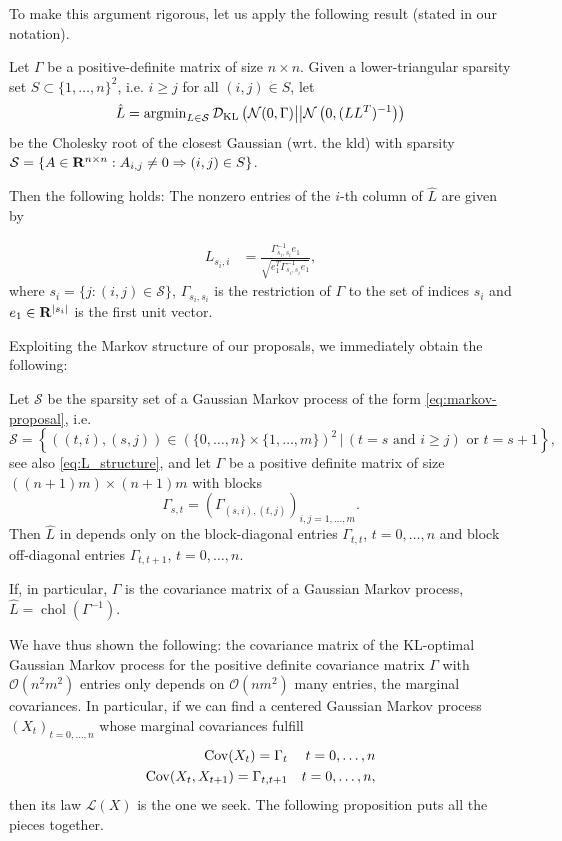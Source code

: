 To make this argument rigorous, let us apply the following result (stated in our notation).
\begin{theorem}
    \label{thm:schafer_cholesky_analytical}
    Let $\Gamma$ be a positive-definite matrix of size $n\times n$. Given a lower-triangular sparsity set $S \subset \{1, \dots, n\}^{2}$, i.e. $i \geq j$ for all $(i,j) \in S$, let 
    $$
    \hat L = \operatorname{argmin}_{L \in \mathcal S} \mathcal D_{\text{KL}} \left(\mathcal N (0, \Gamma) \middle|\middle| \mathcal N \left( 0, (LL^{T})^{-1} \right)\right)
    $$
    be the Cholesky root of the closest Gaussian (wrt. the \gls{kld}) with sparsity $\mathcal S = \{A \in \mathbf R^{n \times n}: A_{i,j} \neq 0 \Rightarrow (i,j) \in S\}$. 

    Then the following holds:
    The nonzero entries of the $i$-th column of $\hat L$ are given by 
    
    \begin{align}
    \label{eq:schafer_gamma}
        L_{s_{i}, i} &= \frac{\Gamma_{s_{i}, s_{i}}^{-1} e_{1}}{\sqrt{e_{1}^{T}\Gamma_{s_{i}, s_{i}}^{-1} e_{1}}},
    \end{align}
    where $s_{i} = \{j : (i,j) \in \mathcal S\}$, $\Gamma_{s_{i}, s_{i}}$ is the restriction of $\Gamma$ to the set of indices $s_{i}$ and $e_{1} \in\mathbf R^{\lvert s_{i}\rvert}$ is the first unit vector.
\end{theorem}
Exploiting the Markov structure of our proposals, we immediately obtain the following:
\begin{corollary}
    \label{cor:markov_sparsity}
    Let $\mathcal S$ be the sparsity set of a Gaussian Markov process of the form \eqref{eq:markov-proposal}, i.e. 
    $$
        \mathcal S = \left\{ ((t,i),(s,j)) \in \left(\{0,\dots, n\}\times \{1,\dots, m\}\right)^{2} \,|\, (t = s \text{ and } i \geq  j) \text{ or } t = s + 1 \right\},
    $$
    see also \eqref{eq:L_structure},
    and let $\Gamma$ be a positive definite matrix of size $((n+1)m)\times(n + 1)m$ with blocks
    $$
        \Gamma_{s,t} = (\Gamma_{(s,i),(t,j)})_{i,j =1,\dots,m}.
    $$
    Then $\hat L$ in  depends only on the block-diagonal entries $\Gamma_{t, t}$, $ t = 0, \dots, n$ and block off-diagonal entries $\Gamma_{t, t + 1}$, $t = 0, \dots, n$.

    If, in particular, $\Gamma$ is the covariance matrix of a Gaussian Markov process, $\hat L = \operatorname{chol} (\Gamma ^{-1})$.
\end{corollary}

We have thus shown the following: the covariance matrix of the KL-optimal Gaussian Markov process for the positive definite covariance matrix $\Gamma$ with $\mathcal O(n^{2}m^{2})$ entries only depends on $\mathcal O(n m^{2})$ many entries, the marginal covariances. In particular, if we can find a centered Gaussian Markov process $(X_{t})_{t = 0, \dots, n}$ whose marginal covariances fulfill 
\begin{align*}
    \operatorname{Cov} (X_{t}) = \Gamma_{t}  && t = 0, \dots, n\\
    \operatorname{Cov} (X_{t}, X_{t + 1}) = \Gamma_{t, t + 1} && t = 0, \dots, n,
\end{align*}
then its law $\mathcal L (X)$ is the one we seek. The following proposition puts all the pieces together.

